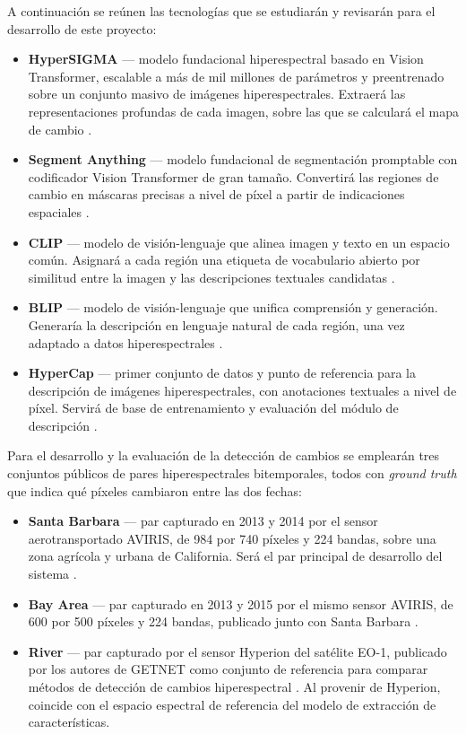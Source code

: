 A continuación se reúnen las tecnologías que se estudiarán y revisarán para el desarrollo de este proyecto:
\begin{itemize}[leftmargin=1.27cm]
  \item \textbf{HyperSIGMA} --- modelo fundacional hiperespectral basado en Vision Transformer, escalable a más de mil millones de parámetros y preentrenado sobre un conjunto masivo de imágenes hiperespectrales. Extraerá las representaciones profundas de cada imagen, sobre las que se calculará el mapa de cambio \parencite{wang2024hypersigma}.
  \item \textbf{Segment Anything} --- modelo fundacional de segmentación promptable con codificador Vision Transformer de gran tamaño. Convertirá las regiones de cambio en máscaras precisas a nivel de píxel a partir de indicaciones espaciales \parencite{kirillov2023sam}.
  \item \textbf{CLIP} --- modelo de visión-lenguaje que alinea imagen y texto en un espacio común. Asignará a cada región una etiqueta de vocabulario abierto por similitud entre la imagen y las descripciones textuales candidatas \parencite{radford2021clip}.
  \item \textbf{BLIP} --- modelo de visión-lenguaje que unifica comprensión y generación. Generaría la descripción en lenguaje natural de cada región, una vez adaptado a datos hiperespectrales \parencite{li2022blip}.
  \item \textbf{HyperCap} --- primer conjunto de datos y punto de referencia para la descripción de imágenes hiperespectrales, con anotaciones textuales a nivel de píxel. Servirá de base de entrenamiento y evaluación del módulo de descripción \parencite{das2025hypercap}.
\end{itemize}

Para el desarrollo y la evaluación de la detección de cambios se emplearán tres conjuntos públicos de pares hiperespectrales bitemporales, todos con \textit{ground truth} que indica qué píxeles cambiaron entre las dos fechas:
\begin{itemize}[leftmargin=1.27cm]
  \item \textbf{Santa Barbara} --- par capturado en 2013 y 2014 por el sensor aerotransportado AVIRIS, de 984 por 740 píxeles y 224 bandas, sobre una zona agrícola y urbana de California. Será el par principal de desarrollo del sistema \parencite{hasanlou2018hyperspectral}.
  \item \textbf{Bay Area} --- par capturado en 2013 y 2015 por el mismo sensor AVIRIS, de 600 por 500 píxeles y 224 bandas, publicado junto con Santa Barbara \parencite{hasanlou2018hyperspectral}.
  \item \textbf{River} --- par capturado por el sensor Hyperion del satélite EO-1, publicado por los autores de GETNET como conjunto de referencia para comparar métodos de detección de cambios hiperespectral \parencite{wang2019getnet}. Al provenir de Hyperion, coincide con el espacio espectral de referencia del modelo de extracción de características.
\end{itemize}

